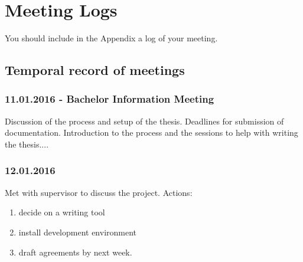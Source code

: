 \chapter{Meeting Logs}
You should include in the Appendix a log of your meeting.
\section{Temporal record of meetings}
\subsection{11.01.2016 - Bachelor Information Meeting}
Discussion of the process and setup of the thesis.  Deadlines for submission of documentation.  Introduction to the process and the sessions to help with writing the thesis....

\subsection{12.01.2016}
Met with supervisor to discuss the project. Actions:
\begin{enumerate}
	\item decide on a writing tool
	\item install development environment
	\item draft agreements by next week.
\end{enumerate}




